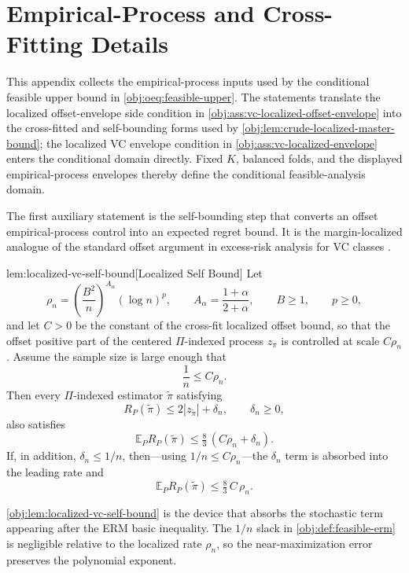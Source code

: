 \section{Empirical-Process and Cross-Fitting Details}

This appendix collects the empirical-process inputs used by the conditional feasible upper bound in \cref{obj:oeq:feasible-upper}.  The statements translate the localized offset-envelope side condition in \cref{obj:ass:vc-localized-offset-envelope} into the cross-fitted and self-bounding forms used by \cref{obj:lem:crude-localized-master-bound}; the localized VC envelope condition in \cref{obj:ass:vc-localized-envelope} enters the conditional domain directly.  Fixed \(K\), balanced folds, and the displayed empirical-process envelopes thereby define the conditional feasible-analysis domain.

The first auxiliary statement is the self-bounding step that converts an offset empirical-process control into an expected regret bound.  It is the margin-localized analogue of the standard offset argument in excess-risk analysis for VC classes \citep{Audibert2007,Massart2006,Tsybakov2009}.

\begin{lemmav}{lem:localized-vc-self-bound}[Localized Self Bound]
Let
\[
\rho_n=\left(\frac{B^2}{n}\right)^{A_\alpha}(\log n)^p,
\qquad A_\alpha=\frac{1+\alpha}{2+\alpha},
\qquad B\ge 1,
\qquad p\ge 0,
\]
and let \(C>0\) be the constant of the cross-fit localized offset bound, so that the offset positive part of the centered \(\Pi\)-indexed process \(z_\pi\) is controlled at scale \(C\rho_n\). Assume the sample size is large enough that
\[
\frac1n\le C\rho_n .
\]
Then every \(\Pi\)-indexed estimator \(\widetilde\pi\) satisfying
\[
R_P(\widetilde\pi)\le 2|z_{\widetilde\pi}|+\delta_n,
\qquad \delta_n\ge 0,
\]
also satisfies
\[
\mathbb E_P R_P(\widetilde\pi)\le \tfrac{8}{3}\,(C\rho_n+\delta_n).
\]
If, in addition, \(\delta_n\le 1/n\), then---using \(1/n\le C\rho_n\)---the \(\delta_n\) term is absorbed into the leading rate and
\[
\mathbb E_P R_P(\widetilde\pi)\le \tfrac{8}{3}\,C\,\rho_n .
\]
\end{lemmav}

\cref{obj:lem:localized-vc-self-bound} is the device that absorbs the stochastic term appearing after the ERM basic inequality.  The \(1/n\) slack in \cref{obj:def:feasible-erm} is negligible relative to the localized rate \(\rho_n\), so the near-maximization error preserves the polynomial exponent.

